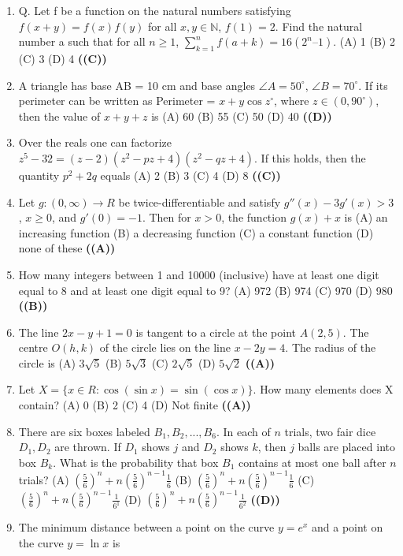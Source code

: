 \documentclass{article}
\begin{document}
\begin{enumerate}
(C) $2n^3 - n$
(D) $(2n - 1) n^2$ \hfill \textbf{((A))}
\item Q. Let f be a function on the natural numbers satisfying
$f(x + y) = f(x) f(y)$ for all $x, y \in \mathbb{N}$, $f(1) = 2$.
Find the natural number a such that for all $n \ge 1$,
$\sum_{k=1}^{n} f(a+k) = 16(2^n – 1)$.
(A) 1
(B) 2
(C) 3
(D) 4 \hfill \textbf{((C))}
\item A triangle has base AB = 10 cm and base angles $\angle A = 50^\circ$, $\angle B = 70^\circ$. If its perimeter can be written as Perimeter = $x + y \cos z^\circ$, where $z \in (0,90^\circ)$, then the value of $x + y + z$ is
(A) 60
(B) 55
(C) 50
(D) 40 \hfill \textbf{((D))}
\item Over the reals one can factorize $z^5 - 32 = (z - 2) (z^2 - pz + 4) (z^2 - qz + 4)$. If this holds, then the quantity $p^2 + 2q$ equals
(A) 2
(B) 3
(C) 4
(D) 8 \hfill \textbf{((C))}
\item Let $g: (0,\infty) \to R$ be twice-differentiable and satisfy $g''(x) - 3g'(x) > 3$, $x \ge 0$, and $g'(0) = -1$. Then for $x > 0$, the function $g(x) + x$ is
(A) an increasing function
(B) a decreasing function
(C) a constant function
(D) none of these \hfill \textbf{((A))}
\item How many integers between 1 and 10000 (inclusive) have at least one digit equal to 8 and at least one digit equal to 9?
(A) 972
(B) 974
(C) 970
(D) 980 \hfill \textbf{((B))}
\item The line $2x - y + 1 = 0$ is tangent to a circle at the point $A(2,5)$. The centre $O(h, k)$ of the circle lies on the line $x - 2y = 4$. The radius of the circle is
(A) $3\sqrt{5}$
(B) $5\sqrt{3}$
(C) $2\sqrt{5}$
(D) $5\sqrt{2}$ \hfill \textbf{((A))}
\item Let $X = \{x \in R : \cos(\sin x) = \sin(\cos x)\}$. How many elements does X contain?
(A) 0
(B) 2
(C) 4
(D) Not finite \hfill \textbf{((A))}
\item There are six boxes labeled $B_1, B_2, ..., B_6$. In each of $n$ trials, two fair dice $D_1, D_2$ are thrown. If $D_1$ shows $j$ and $D_2$ shows $k$, then $j$ balls are placed into box $B_k$. What is the probability that box $B_1$ contains at most one ball after $n$ trials?
(A) $(\frac{5}{6})^n + n (\frac{5}{6})^{n-1} \frac{1}{6}$
(B) $(\frac{5}{6})^n + n (\frac{5}{6})^{n-1} \frac{1}{6}$
(C) $(\frac{5}{6})^n + n (\frac{5}{6})^{n-1} \frac{1}{6^1}$
(D) $(\frac{5}{6})^n + n (\frac{5}{6})^{n-1} \frac{1}{6^2}$ \hfill \textbf{((D))}
\item The minimum distance between a point on the curve $y = e^x$ and a point on the curve $y = \ln x$ is

\end{enumerate}
\end{document}
